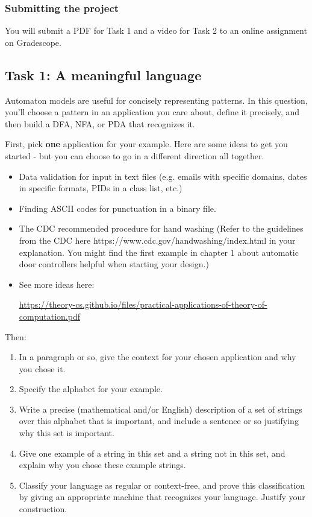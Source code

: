 \subsubsection*{Submitting the project}
You will submit a PDF for Task 1 and a video for Task 2 
to an online assignment on Gradescope.

\newpage
\subsection*{Task 1: A meaningful language}

Automaton models are useful for concisely representing patterns. 
In this question, you'll choose a pattern in an application you care about, 
define it precisely, and then build a DFA, NFA, or PDA that 
recognizes it.

First, pick {\bf one} application for your example. 
Here are some ideas to 
get you started - but you can choose to go in a different direction all together.
\begin{itemize}
\item Data validation for input in text files (e.g. emails with 
specific domains, dates in specific formats, PIDs in a class list, etc.)
\item Finding ASCII codes for punctuation in a binary file.
\item The CDC recommended procedure for hand washing (Refer to the guidelines from the CDC here https://www.cdc.gov/handwashing/index.html in your explanation. You might find the first example in chapter 1 about automatic door controllers helpful when starting your design.)
\item See more ideas here: 

{\scriptsize \url{https://theory-cs.github.io/files/practical-applications-of-theory-of-computation.pdf}}
\end{itemize}

Then:
\begin{enumerate}
    \item In a paragraph or so, give the context for your chosen
    application and why you chose it.
    \item Specify the alphabet for your example.
    \item Write a precise (mathematical and/or English) description
    of a set of strings over this alphabet that is important, 
    and include a sentence or so justifying why this set is important.
    \item Give one example of a string in this set and a string not 
    in this set, and explain why you chose these example strings.
    \item Classify your language as regular or context-free, and prove
    this classification by giving an appropriate machine that
    recognizes your language. Justify your construction.
\end{enumerate}

